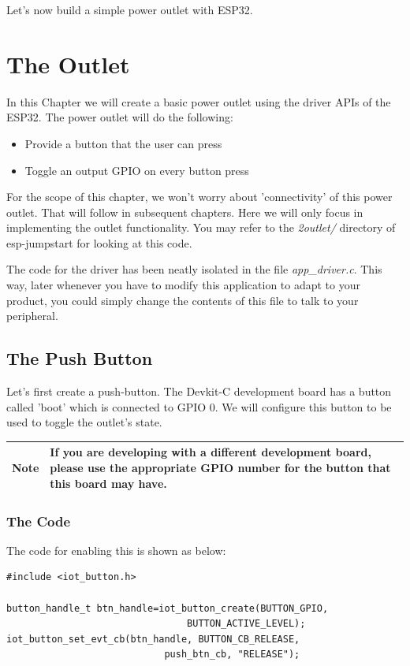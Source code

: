 \documentclass[11pt,fleqn]{book} %
\newcommand{\ksnotebox}[1]{\begin{tabularx}{\textwidth}{ |c|X| }
\hline
\cellcolor{lightgray} \textbf{Note} & #1 \\
\hline
\end{tabularx}} %
\begin{document}
Let's now build a simple power outlet with ESP32.



\chapter{The Outlet} \label{the-outlet}

In this Chapter we will create a basic power outlet using the driver APIs of the ESP32. The power outlet will do the following:
\begin{itemize}
    \item Provide a button that the user can press
    \item Toggle an output GPIO on every button press
\end{itemize}
For the scope of this chapter, we won't worry about 'connectivity' of this power outlet. That will follow in subsequent chapters. Here we will only focus in implementing the outlet functionality. You may refer to the \textit{2outlet/} directory of esp-jumpstart for looking at this code. 

The code for the driver has been neatly isolated in the file \textit{app\_driver.c}. This way, later whenever you have to modify this application to adapt to your product, you could simply change the contents of this file to talk to your peripheral.

\section{The Push Button}
Let's first create a push-button. The Devkit-C development board has a button called 'boot' which is connected to GPIO 0. We will configure this button to be used to toggle the outlet's state.

\ksnotebox{If you are developing with a different development board, please use the appropriate GPIO number for the button that this board may have.}

\subsection{The Code}\label{sec:push_button}
The code for enabling this is shown as below:
\begin{verbatim}
#include <iot_button.h>

button_handle_t btn_handle=iot_button_create(BUTTON_GPIO,
                                BUTTON_ACTIVE_LEVEL);
iot_button_set_evt_cb(btn_handle, BUTTON_CB_RELEASE,
                            push_btn_cb, "RELEASE");

\end{verbatim}
\end{document}
